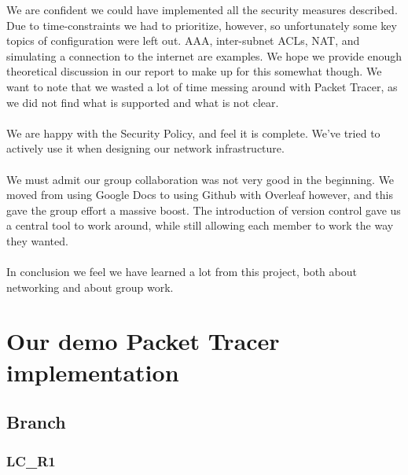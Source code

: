 We are confident we could have implemented all the security measures described. Due to time-constraints we had to prioritize, however, so unfortunately some key topics of configuration were left out. AAA, inter-subnet ACLs, NAT, and simulating a connection to the internet are examples. We hope we provide enough theoretical discussion in our report to make up for this somewhat though. We want to note that we wasted a lot of time messing around with Packet Tracer, as we did not find what is supported and what is not clear.
\\
\\
We are happy with the Security Policy, and feel it is complete. We've tried to actively use it when designing our network infrastructure.
\\
\\
We must admit our group collaboration was not very good in the beginning. We moved from using Google Docs to using Github with Overleaf however, and this gave the group effort a massive boost. The introduction of version control gave us a central tool to work around, while still allowing each member to work the way they wanted.
\\
\\
In conclusion we feel we have learned a lot from this project, both about networking and about group work.







\clearpage %

\nocite{*}





\clearpage %
\appendix

\section{Our demo Packet Tracer implementation} \label{config}

\subsection{Branch} \label{configbranch}
\subsubsection{LC\_R1} \label{configwlc}
\inputminted[fontsize=\tiny,linenos,breaklines]{text}{./Config/Branch/LC-R1.txt}
